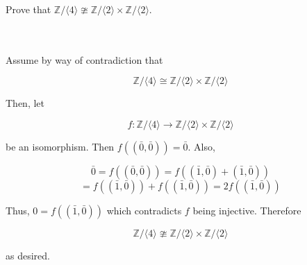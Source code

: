 Prove that
$\mathbb{Z}/\langle4\rangle\ncong\mathbb{Z}/\langle2\rangle\times\mathbb{Z}/\langle2\rangle$.\\\\

\begin{solution}\renewcommand{\qedsymbol}{}\ \\
    Assume by way of contradiction that
    
    $$\mathbb{Z}/\langle4\rangle\cong\mathbb{Z}/\langle2\rangle\times\mathbb{Z}/\langle2\rangle$$
    
    Then, let
    
    $$f:\mathbb{Z}/\langle4\rangle\to\mathbb{Z}/\langle2\rangle\times\mathbb{Z}/\langle2\rangle$$
    
    be an isomorphism. Then $f((\bar{0},\bar{0}))=\bar{0}$. Also,
    
    $$\bar{0}=f((\bar{0},\bar{0}))=f((\bar{1},\bar{0})+(\bar{1},\bar{0}))$$
    $$=f((\bar{1},\bar{0}))+f((\bar{1},\bar{0}))=2f((\bar{1},\bar{0}))$$
    
    Thus, $0=f((\bar{1},\bar{0}))$ which contradicts $f$ being injective. Therefore
    
    $$\mathbb{Z}/\langle4\rangle\ncong\mathbb{Z}/\langle2\rangle\times\mathbb{Z}/\langle2\rangle$$
    
    as desired.

\end{solution}
